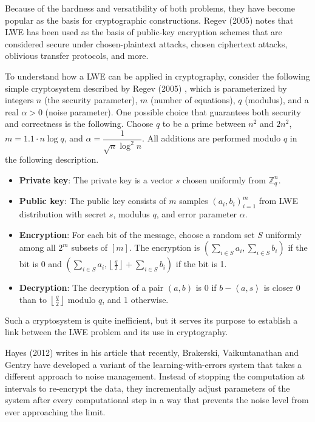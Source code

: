 Because of the hardness and versatibility of both problems, they have become popular as the basis for cryptographic constructions. Regev (2005) \cite{regevlearning} notes that LWE has been used as the basis of public-key encryption schemes that are considered secure under chosen-plaintext attacks, chosen ciphertext attacks, oblivious transfer protocols, and more.

To understand how a LWE can be applied in cryptography, consider the following simple cryptosystem described by Regev (2005) \cite{regevlearning}, which is parameterized by integers $n$ (the security parameter), $m$ (number of equations), $q$ (modulus), and a real $\alpha > 0$ (noise parameter). One possible choice that guarantees both security and correctness is the following. Choose $q$ to be a prime between $n^2$ and $2n^2$, $m=1.1 \cdot n\log q$, and $\alpha = \dfrac{1}{\sqrt{n} \log^{2}n}$. All additions are performed modulo $q$ in the following description. 

\begin{itemize}
\item \textbf{Private key}: The private key is a vector $s$ chosen uniformly from $\mathbb{Z}_{q}^{n}$.
\item \textbf{Public key}: The public key consists of $m$ samples $(a_{i}, b_{i})_{i=1}^m$ from LWE distribution with secret $s$, modulus $q$, and error parameter $\alpha$.
\item \textbf{Encryption}: For each bit of the message, choose a random set $S$ uniformly among all $2^m$ subsets of $[m]$. The encryption is $(\sum_{i \in S} a_{i}, \sum_{i \in S} b_{i})$ if the bit is 0 and $(\sum_{i \in S} a_{i}, \left \lfloor{\frac{q}{2}}\right \rfloor + \sum_{i \in S} b_{i})$ if the bit is 1.
\item \textbf{Decryption}: The decryption of a pair $(a,b)$ is 0 if $b - \left \langle a,s \right \rangle$ is closer 0 than to $\left \lfloor \frac{q}{2} \right \rfloor$ modulo $q$, and 1 otherwise. 
\end{itemize}
Such a cryptosystem is quite inefficient, but it serves its purpose to establish a link between the LWE problem and its use in cryptography.

Hayes (2012) \cite{Hayes2012} writes in his article that recently, Brakerski, Vaikuntanathan and Gentry have developed a variant of the learning-with-errors system that takes a different approach to noise management. Instead of stopping the computation at intervals to re-encrypt the data, they incrementally adjust parameters of the system after every computational step in a way that prevents the noise level from ever approaching the limit.

